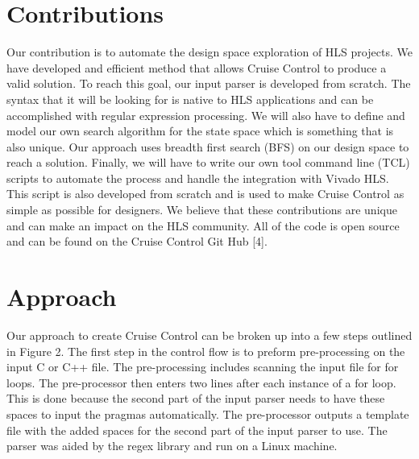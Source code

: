 \documentclass[letterpaper, 10 pt, conference]{IEEEconf}  %
\begin{document}
\section{Contributions}
Our contribution is to automate the design space exploration of HLS projects. We have developed and efficient method that allows Cruise Control to produce a valid solution. To reach this goal, our input parser is developed from scratch. The syntax that it will be looking for is native to HLS applications and can be accomplished  with regular expression processing. We will also have to define and model our own search algorithm for the state space which is something that is also unique. Our approach uses breadth first search (BFS) on our design space to reach a solution.  Finally, we will have to write our own tool command line (TCL) scripts to automate the process and handle the integration with Vivado HLS. This script is also developed from scratch and is used to make Cruise Control as simple as possible for designers. We believe that these contributions are unique and can make an impact on the HLS community. All of the code is open source and can be found on the Cruise Control Git Hub [4]. 


\section{Approach}
Our approach to create Cruise Control can be broken up into a few steps outlined in Figure 2. The first step in the control flow is to preform pre-processing on the input C or C++ file.  The pre-processing includes scanning the input file for for loops. The pre-processor then enters two lines after each instance of a for loop. This is done because the second part of the input parser needs to have these spaces to input the pragmas automatically. The pre-processor outputs a template file with the added spaces for the second part of the input parser to use. The parser was aided by the regex library and run on a Linux machine.  \newline
\end{document}
